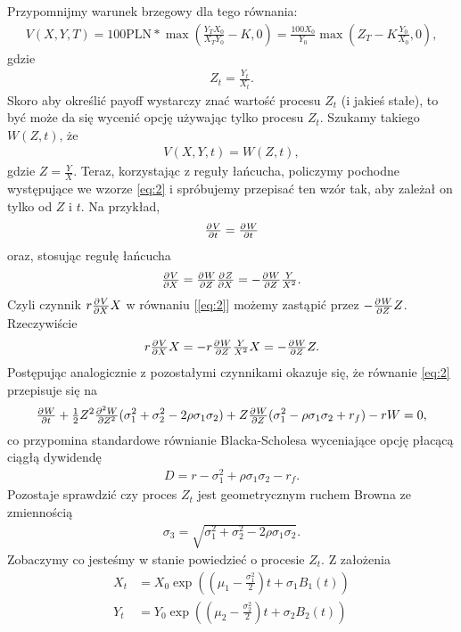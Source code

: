 \documentclass[12pt]{article}
\providecommand{\pd}[3][]{\ensuremath{
\ifinner
\tfrac{\partial{^{#1}}#2}{\partial{#3^{#1}}}
\else
\dfrac{\partial{^{#1}}#2}{\partial{#3^{#1}}}
\fi
}}
\begin{document}
Przypomnijmy warunek brzegowy dla tego równania:
\begin{align*}
    V(X, Y, T) =  100 \text{PLN} * \max \left(\tfrac{Y_TX_0}{X_TY_0} - K, 0 \right) = \tfrac{100 X_0}{Y_0} \max( Z_T - K\tfrac{Y_0}{X_0}, 0),
\end{align*}
gdzie 
\begin{align*}
    Z_t = \tfrac{Y_t}{X_t}.
\end{align*}
Skoro aby określić payoff wystarczy znać wartość procesu $Z_t$ (i jakieś stałe), to być może da się wycenić opcję używając tylko procesu $Z_t$. Szukamy takiego $W(Z, t)$, że
\begin{align*}
    V(X, Y, t) = W(Z, t), 
\end{align*}
gdzie $Z = \tfrac{Y}{X}$. Teraz, korzystając z reguły łańcucha, policzymy pochodne występujące we wzorze \ref{eq:2} i spróbujemy przepisać ten wzór tak, aby zależał on tylko od $Z$ i $t$.
Na przykład, 
\begin{align*}
    \pd{V}{t} = \pd{W}{t}
\end{align*}
oraz, stosując regułę łańcucha
\begin{align*}
    \pd{V}{X} = \pd{W}{Z} \pd{Z}{X} = - \pd{W}{Z} \tfrac{Y}{X^2}.
\end{align*}
Czyli czynnik $r \pd{V}{X}X  $ w równaniu [\ref{eq:2}] możemy zastąpić przez $- \pd{W}{Z}Z$. Rzeczywiście
\begin{align*}
    r \pd{V}{X}X = -r \pd{W}{Z} \tfrac{Y}{X^2} X =  - \pd{W}{Z}Z.
\end{align*}
Postępując analogicznie z pozostałymi czynnikami okazuje się, że równanie \ref{eq:2} przepisuje się na 
\begin{align*} \label{{eq:3}}
    \pd{W}{t} + \tfrac{1}{2}Z^2\pd[2]{W}{Z} (\sigma_1^2 + \sigma_2^2 - 2\rho \sigma_1 \sigma_2) + Z\pd{W}{Z} (\sigma_1^2 - \rho \sigma_1 \sigma_2 + r_f) - rW = 0,
\end{align*}
co przypomina standardowe równianie Blacka-Scholesa wyceniające opcję płacącą ciągłą dywidendę
\begin{align*}
    D = r - \sigma_1^2 + \rho \sigma_1 \sigma_2 - r_f.
\end{align*}
Pozostaje sprawdzić czy proces $Z_t$ jest geometrycznym ruchem Browna ze zmiennością 
\begin{align*}
    \sigma_3 = \sqrt{ \sigma_1^2 + \sigma_2^2 - 2 \rho \sigma_1 \sigma_2 }.
\end{align*}
Zobaczymy co jesteśmy w stanie powiedzieć o procesie $Z_t$. Z założenia 
\begin{align*}
    X_t &= X_0 \exp \left( (\mu_1 - \tfrac{\sigma_1^2}{2})t + \sigma_1 B_1(t)\right) \\
    Y_t &= Y_0 \exp \left ( (\mu_2 - \tfrac{\sigma_2^2}{2})t + \sigma_2 B_2(t)\right)\\
\end{align*}
\end{document}
